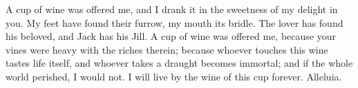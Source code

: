 A cup of wine was offered me, and I drank it in the sweetness of my delight in you. My feet have found their furrow, my mouth its bridle. The lover has found his beloved, and Jack has his Jill. A cup of wine was offered me, because your vines were heavy with the riches therein; because whoever touches this wine tastes life itself, and whoever takes a draught becomes immortal; and if the whole world perished, I would not. I will live by the wine of this cup forever. Alleluia.
